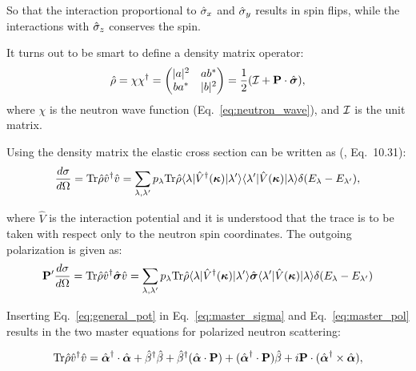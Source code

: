 So that the interaction proportional to $\hat{\sigma}_x$ and $\hat{\sigma}_y$
results in spin flips, while the interactions with $\hat{\sigma}_z$
conserves the spin.

It turns out to be smart to define a density matrix operator:
\begin{equation}
  \hat{\rho} = \chi \chi^\dagger =  
  \left( \begin{matrix} 
    |a|^2 & ab^\ast \\ 
    ba^\ast & |b|^2 
  \end{matrix} \right) 
  = \frac{1}{2}({\cal I}+\mathbf{P} \cdot \hat{\mbox{\boldmath $\sigma$}}),
\end{equation}
where $\chi$ is the neutron wave function (Eq.~\ref{eq:neutron_wave}),
and ${\cal I}$ is the unit matrix.

Using the density matrix the elastic cross section can be written as
(\cite{lovesey}, Eq.~10.31):
\begin{equation}
  \label{eq:master_sigma}
  \frac{d\sigma}{d\Omega} = \text{Tr} \hat{\rho} \hat{v}^\dagger \hat{v}
  = \sum_{\lambda, \lambda'} p_\lambda \text{Tr} \hat{\rho}
  \langle \lambda | \hat{V}^\dagger(\mathbf{\mbox{\boldmath $\kappa$}}) | \lambda' \rangle
  \langle \lambda' | \hat{V}(\mathbf{\mbox{\boldmath $\kappa$}}) | \lambda \rangle
  \delta(E_\lambda - E_{\lambda'}),
\end{equation}

where $\hat{V}$ is the interaction potential and it is understood that
the trace is to be taken with respect only to the neutron spin
coordinates. The outgoing polarization is given as:
\begin{equation}
  \label{eq:master_pol}
  \mathbf{P}' \frac{d\sigma}{d\Omega} = 
  \text{Tr} \hat{\rho} \hat{v}^\dagger \hat{\mbox{\boldmath $\sigma$}} \hat{v}
  = \sum_{\lambda, \lambda'} p_\lambda \text{Tr} \hat{\rho}
  \langle \lambda | \hat{V}^\dagger(\mathbf{\mbox{\boldmath $\kappa$}}) | \lambda' \rangle
  \hat{\mbox{\boldmath $\sigma$}}
  \langle \lambda' | \hat{V}(\mathbf{\mbox{\boldmath $\kappa$}}) | \lambda \rangle
  \delta(E_\lambda - E_{\lambda'}) 
\end{equation}

Inserting Eq.~\ref{eq:general_pot} in Eq.~\ref{eq:master_sigma} and
Eq.~\ref{eq:master_pol} results in the two master equations for
polarized neutron scattering:

\begin{equation}
  \label{eq:general_sigma}
  \text{Tr} \hat{\rho} \hat{v}^\dagger \hat{v} = 
  \hat{\mbox{\boldmath $\alpha$}}^\dagger \cdot \hat{\mbox{\boldmath $\alpha$}} + \hat{\beta}^\dagger \hat{\beta}+
  \hat{\beta}^\dagger (\hat{\mbox{\boldmath $\alpha$}} \cdot \mathbf{P}) +
  (\hat{\mbox{\boldmath $\alpha$}}^\dagger \cdot \mathbf{P}) \hat{\beta} +
  i\mathbf{P} \cdot (\hat{\mbox{\boldmath $\alpha$}}^\dagger \times \hat{\mbox{\boldmath $\alpha$}}),
\end{equation}

